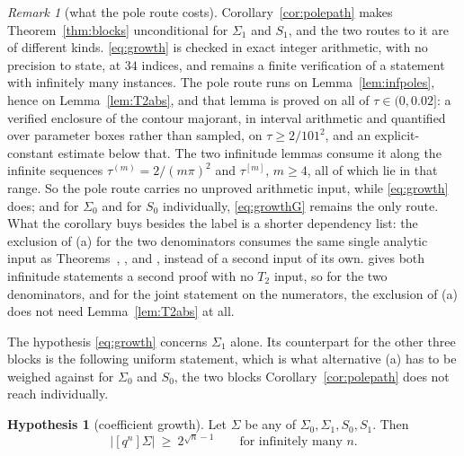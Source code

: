 \documentclass[11pt]{article}
\theoremstyle{plain}
\theoremstyle{definition}
\newtheorem{hypothesis}[theorem]{Hypothesis}
\theoremstyle{remark}
\newtheorem{remark}[theorem]{Remark}
\begin{document}
\begin{remark}[what the pole route costs]\label{rem:polepathcost}
Corollary~\ref{cor:polepath} makes Theorem~\ref{thm:blocks} unconditional for $\Sigma_1$ and $S_1$,
and the two routes to it are of different kinds. \eqref{eq:growth} is checked in exact integer
arithmetic, with no precision to state, at $34$ indices, and remains a finite verification of a
statement with infinitely many instances. The pole route runs on Lemma~\ref{lem:infpoles}, hence on
Lemma~\ref{lem:T2abs}, and that lemma is proved on all of $\tau\in(0,0.02]$: a verified enclosure
of the contour majorant, in interval arithmetic and quantified over parameter boxes rather than
sampled, on $\tau\ge2/101^2$, and an explicit-constant estimate below that. The two infinitude
lemmas consume it along the infinite sequences $\tau^{(m)}=2/(m\pi)^2$ and $\tau^{[m]}$, $m\ge4$,
all of which lie in that range. So the pole route carries no unproved arithmetic input, while
\eqref{eq:growth} does; and for $\Sigma_0$ and for $S_0$ individually, \eqref{eq:growthG} remains
the only route. What the corollary buys besides the label is a shorter dependency list: the
exclusion of \textup{(a)} for the two denominators consumes the same single analytic input as
Theorems~{\cite[\textup{thm:travelres}]{Bonfioli2026bA}}, {\cite[\textup{thm:V}]{Bonfioli2026bA}}, {\cite[\textup{thm:U}]{Bonfioli2026bA}} and {\cite[Corollary \textup{cor:beta}]{Bonfioli2026bA}}, instead of a
second input of its own. {\cite[Proposition ``infinitely many travel poles, without $T_2$'', \textup{prop:infpolesalt}]{Bonfioli2026bA}} gives both infinitude statements a
second proof with no $T_2$ input, so for the two denominators, and for the joint statement on the
numerators, the exclusion of \textup{(a)} does not need Lemma~\ref{lem:T2abs} at all.
\end{remark}

\noindent The hypothesis \eqref{eq:growth} concerns $\Sigma_1$ alone. Its counterpart for the other
three blocks is the following uniform statement, which is what alternative \textup{(a)} has to be
weighed against for $\Sigma_0$ and $S_0$, the two blocks Corollary~\ref{cor:polepath} does not
reach individually.

\begin{hypothesis}[coefficient growth]\label{hyp:growth}
Let $\Sigma$ be any of $\Sigma_0,\Sigma_1,S_0,S_1$. Then
\begin{equation}\label{eq:growthG}
   \bigl|[q^{n}]\Sigma\bigr|\ \ge\ 2^{\sqrt n-1}\qquad\text{for infinitely many }n .
\end{equation}
\end{hypothesis}
\end{document}
